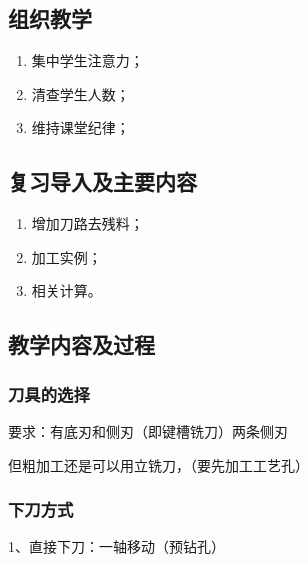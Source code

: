 \jxhj{%
	}

\makeshouye %

\subsection{组织教学}
\begin{enumerate}[\hspace{2em}1、]
	\item 集中学生注意力；
	\item 清查学生人数；
	\item 维持课堂纪律；
\end{enumerate}

\subsection{复习导入及主要内容}
\begin{enumerate}[1、]
\item 增加刀路去残料；
\item 加工实例；
\item 相关计算。
\end{enumerate}

\subsection{教学内容及过程}
\subsubsection{刀具的选择}
要求：有底刃和侧刃（即键槽铣刀）两条侧刃

但粗加工还是可以用立铣刀，（要先加工工艺孔）

\subsubsection{下刀方式}
1、直接下刀：一轴移动（预钻孔） 

